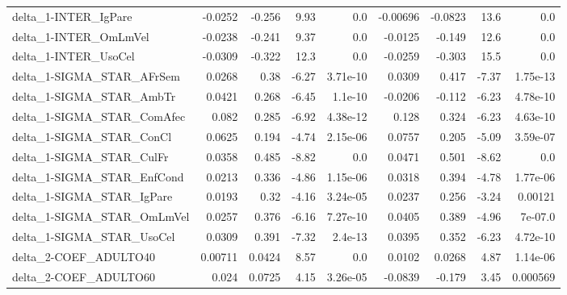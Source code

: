 \begin{tabular}{lrrrrrrrr}
delta\_1-INTER\_IgPare                  &     -0.0252 &       -0.256 &     9.93 &      0.0 &   -0.00696 &     -0.0823 &         13.6 &           0.0 \\
delta\_1-INTER\_OmLmVel                 &     -0.0238 &       -0.241 &     9.37 &      0.0 &    -0.0125 &      -0.149 &         12.6 &           0.0 \\
delta\_1-INTER\_UsoCel                  &     -0.0309 &       -0.322 &     12.3 &      0.0 &    -0.0259 &      -0.303 &         15.5 &           0.0 \\
delta\_1-SIGMA\_STAR\_AFrSem             &      0.0268 &         0.38 &    -6.27 & 3.71e-10 &     0.0309 &       0.417 &        -7.37 &      1.75e-13 \\
delta\_1-SIGMA\_STAR\_AmbTr              &      0.0421 &        0.268 &    -6.45 &  1.1e-10 &    -0.0206 &      -0.112 &        -6.23 &      4.78e-10 \\
delta\_1-SIGMA\_STAR\_ComAfec            &       0.082 &        0.285 &    -6.92 & 4.38e-12 &      0.128 &       0.324 &        -6.23 &      4.63e-10 \\
delta\_1-SIGMA\_STAR\_ConCl              &      0.0625 &        0.194 &    -4.74 & 2.15e-06 &     0.0757 &       0.205 &        -5.09 &      3.59e-07 \\
delta\_1-SIGMA\_STAR\_CulFr              &      0.0358 &        0.485 &    -8.82 &      0.0 &     0.0471 &       0.501 &        -8.62 &           0.0 \\
delta\_1-SIGMA\_STAR\_EnfCond            &      0.0213 &        0.336 &    -4.86 & 1.15e-06 &     0.0318 &       0.394 &        -4.78 &      1.77e-06 \\
delta\_1-SIGMA\_STAR\_IgPare             &      0.0193 &         0.32 &    -4.16 & 3.24e-05 &     0.0237 &       0.256 &        -3.24 &       0.00121 \\
delta\_1-SIGMA\_STAR\_OmLmVel            &      0.0257 &        0.376 &    -6.16 & 7.27e-10 &     0.0405 &       0.389 &        -4.96 &       7e-07.0 \\
delta\_1-SIGMA\_STAR\_UsoCel             &      0.0309 &        0.391 &    -7.32 &  2.4e-13 &     0.0395 &       0.352 &        -6.23 &      4.72e-10 \\
delta\_2-COEF\_ADULTO40                 &     0.00711 &       0.0424 &     8.57 &      0.0 &     0.0102 &      0.0268 &         4.87 &      1.14e-06 \\
delta\_2-COEF\_ADULTO60                 &       0.024 &       0.0725 &     4.15 & 3.26e-05 &    -0.0839 &      -0.179 &         3.45 &      0.000569 \\

\end{tabular}
